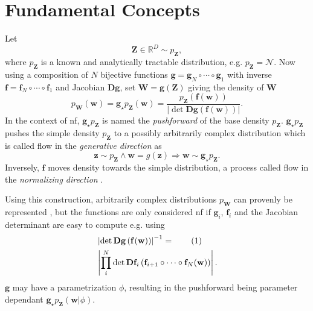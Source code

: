 \documentclass[12pt,fleqn,twocolumn]{article}
\newcommand{\ginv}{\mathbf f}
\newcommand{\push}{\mathbf g_\star p_\mathbf Z}
\newcommand{\numberthis}{\addtocounter{equation}{1}\tag{\theequation}}
\newcommand{\RR}{\ensuremath{\mathbb R}}
\newcommand{\reci}{\ensuremath{^{-1}}}
\begin{document}
\section*{Fundamental Concepts}%
Let 
\begin{equation}
    \mathbf Z \in \RR^D \sim p_\mathbf Z,
\end{equation}
where $p_\mathbf Z$ is a known and analytically tractable distribution, e.g. $p_\mathbf Z=\mathcal N$.
Now using a composition of $N$ bijective functions $\mathbf g=\mathbf g_N \circ \cdots \circ \mathbf g_1$ with inverse $\ginv=\ginv_N \circ \cdots \circ \ginv_1$ and Jacobian $\mathbf D\mathbf g$,
set $\mathbf W=\mathbf g (\mathbf Z)$ giving the density of $\mathbf W$
\begin{equation}\label{eq:dens}
    p_\mathbf W(\mathbf w)=\push(\mathbf w)=\frac{p_\mathbf Z \left(\ginv(\mathbf w)\right)}{\left| \det \mathbf D\mathbf g\left(\ginv(\mathbf w)\right) \right|}.
\end{equation}
In the context of \acrshort{nf}, $\push$ is named the \emph{pushforward} of the base density $p_\mathbf Z$.
$\push$ pushes the simple density $p_\mathbf Z$ to a possibly arbitrarily complex distribution which is called flow in the \emph{generative direction} \cite{koby2021nf} as
\begin{equation}\label{eq:gen}
    \mathbf z \sim p_\mathbf Z \wedge \mathbf w=g(\mathbf z) \Rightarrow \mathbf w \sim \push.
\end{equation}
Inversely, $\ginv$ moves density towards the simple distribution, a process called flow in the \emph{normalizing direction} \cite{koby2021nf}.

Using this construction, arbitrarily complex distributions $p_\mathbf W$ can provenly be represented \cite{boga2007triang}, but the functions are only considered \acrshort{nf} if $\mathbf g_i$, $\ginv_i$ and the Jacobian determinant are easy to compute \cite{koby2021nf} e.g. using 
\begin{align*}
    &\left| \det \mathbf D\mathbf g\left(\ginv(\mathbf w)\right) \right| \reci 
    =\numberthis\\
    &\left| \prod_i^N \det\mathbf D \ginv_i\left(\ginv_{i+1}\circ \cdots \circ \ginv_N(\mathbf w) \right)  \right|.
\end{align*}
$\mathbf g$ may have a parametrization $\phi$, resulting in the pushforward being parameter dependant $\push(\mathbf w|\phi)$.
\end{document}
